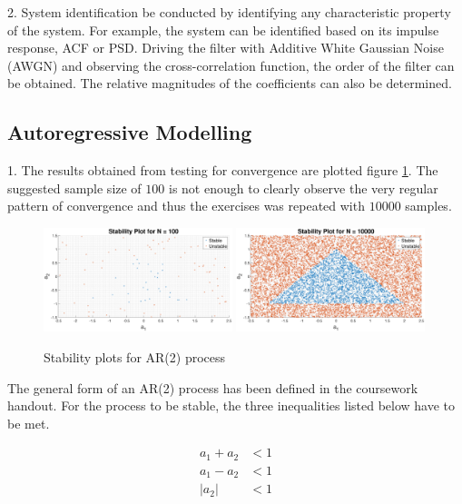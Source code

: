 \documentclass{article}
\begin{document}
2. System identification be conducted by identifying any characteristic property of the system. For example, the system can be identified based on its impulse response, ACF or PSD. Driving the filter with Additive White Gaussian Noise (AWGN) and observing the cross-correlation function, the order of the filter can be obtained. The relative magnitudes of the coefficients can also be determined. 

\subsection{Autoregressive Modelling}\label{sec:ar_modelling}

1. The results obtained from testing for convergence are plotted figure \ref{fig:AR_stability}. The suggested sample size of $100$ is not enough to clearly observe the very regular pattern of convergence and thus the exercises was repeated with $10000$ samples. 

\begin{figure}[H]
    \centering
    \includegraphics[width=0.49\textwidth]{stability_plot_n_100}
    \includegraphics[width=0.49\textwidth]{stability_plot_n_10000}
    \caption{Stability plots for AR(2) process}
    \label{fig:AR_stability}
\end{figure}

The general form of an AR(2) process has been defined in the coursework handout. For the process to be stable, the three inequalities listed below have to be met.

\begin{align}
    a_{1} + a_{2} &< 1\nonumber\\
    a_{1} - a_{2} &< 1\nonumber\\
    |a_{2}| &< 1\nonumber
\end{align}
\end{document}
